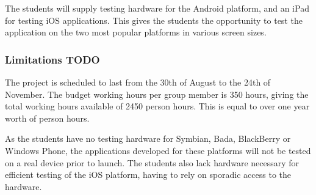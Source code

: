 The students will supply testing hardware for the Android platform, and an iPad for testing iOS applications. This gives the students the opportunity to test the application on the two most popular platforms in various screen sizes.

\subsubsection{Limitations TODO}
The project is scheduled to last from the 30th of August to the 24th of November. The budget working hours per group member is 350 hours, giving the total working hours available of 2450 person hours. This is equal to over one year worth of person hours. 

As the students have no testing hardware for Symbian, Bada, BlackBerry or Windows Phone, the applications developed for these platforms will not be tested on a real device prior to launch. The students also lack hardware necessary for efficient testing of the iOS platform, having to rely on sporadic access to the hardware.
